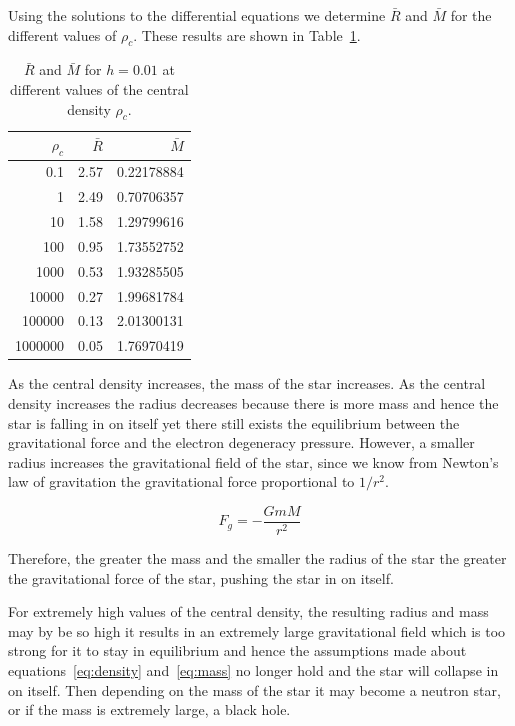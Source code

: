 \documentclass[a4paper]{IEEEtran}
\begin{document}
    Using the solutions to the differential equations we determine 
    $\bar{R}$ and $\bar{M}$ for the different values of $\rho_c$.
    These results are shown in Table~\ref{tbl:central-density}. 

    \begin{table}
    \caption{$\bar{R}$ and $\bar{M}$ for $h = 0.01$ at different
              values of the central density $\rho_c$.} 
    \label{tbl:central-density} 
    \begin{center}
    \begin{tabular}{r|rr} \hline
    $\rho_c$&   $\bar{R}$   &   $\bar{M}$       \\ \hline
    0.1     &   2.57        &   0.22178884     \\ 
    1       &   2.49        &   0.70706357     \\ 
    10      &   1.58        &   1.29799616     \\ 
    100     &   0.95        &   1.73552752      \\ 
    1000    &   0.53        &   1.93285505      \\ 
    10000   &   0.27        &   1.99681784      \\ 
    100000  &   0.13        &   2.01300131      \\ 
    1000000 &   0.05        &   1.76970419      \\ \hline
    \end{tabular}
    \end{center}
    \end{table} 

    As the central density increases, the mass of the star increases.
    As the central density increases the radius decreases because there 
    is more mass and hence the star is falling in on itself yet there still
    exists the equilibrium between the gravitational force and the electron
    degeneracy pressure. However, a smaller radius increases the gravitational
    field of the star, since we know from Newton's law of gravitation
    the gravitational force proportional to $1/r^2$.

    \begin{equation}
        F_g = -\frac{GmM}{r^2}
    \end{equation}

    Therefore, the greater the mass and the smaller the radius of the 
    star the greater the gravitational force of the star, pushing the star
    in on itself. 

    For extremely high values of the central density, the resulting radius
    and mass may by be so high it results in an extremely large gravitational
    field which is too strong for it to stay in equilibrium and hence 
    the assumptions made about equations~\ref{eq:density} and~\ref{eq:mass}
    no longer hold and the star will collapse in on itself. Then depending on
    the mass of the star it may become a neutron star, or if the mass is 
    extremely large, a black hole.
\end{document}
